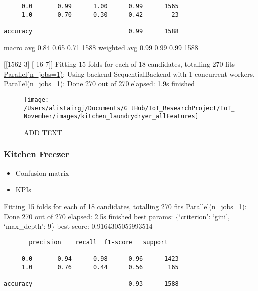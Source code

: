 \documentclass[11pt,]{article}
\providecommand{\tightlist}{%
  \setlength{\itemsep}{0pt}\setlength{\parskip}{0pt}}
\begin{document}
\begin{verbatim}
     0.0       0.99      1.00      0.99      1565
     1.0       0.70      0.30      0.42        23

accuracy                           0.99      1588
\end{verbatim}

macro avg 0.84 0.65 0.71 1588 weighted avg 0.99 0.99 0.99 1588

{[}{[}1562 3{]} {[} 16 7{]}{]} Fitting 15 folds for each of 18
candidates, totalling 270 fits
\href{Done\%20270\%20out\%20of\%20270\%20\%7C\%20elapsed:\%202.1s\%20finished}{Parallel(n\_jobs=1)}:
Using backend SequentialBackend with 1 concurrent workers.
\href{Done\%20270\%20out\%20of\%20270\%20\%7C\%20elapsed:\%202.1s\%20finished}{Parallel(n\_jobs=1)}:
Done 270 out of 270 \textbar{} elapsed: 1.9s finished

\begin{figure}[H]

{\centering \texttt{[image: /Users/alistairgj/Documents/GitHub/IoT\_ResearchProject/IoT\_November/images/kitchen\_laundrydryer\_allFeatures]} 

}

\caption{ADD TEXT}\label{fig:unnamed-chunk-2}
\end{figure}

\pagebreak

\hypertarget{kitchen-freezer}{%
\subsubsection{Kitchen Freezer}\label{kitchen-freezer}}

\begin{itemize}
\tightlist
\item
  Confusion matrix
\item
  KPIs
\end{itemize}

Fitting 15 folds for each of 18 candidates, totalling 270 fits
\href{Done\%20270\%20out\%20of\%20270\%20\%7C\%20elapsed:\%202.1s\%20finished}{Parallel(n\_jobs=1)}:
Done 270 out of 270 \textbar{} elapsed: 2.5s finished best params:
\{`criterion': `gini', `max\_depth': 9\} best score: 0.9164305056993514

\begin{verbatim}
       precision    recall  f1-score   support

     0.0       0.94      0.98      0.96      1423
     1.0       0.76      0.44      0.56       165

accuracy                           0.93      1588
\end{verbatim}
\end{document}
